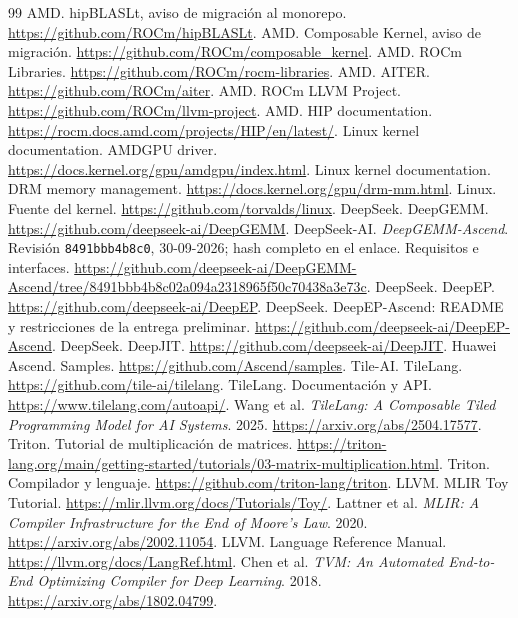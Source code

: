 \documentclass[12pt,a4paper,oneside]{report}
\begin{document}
\begin{thebibliography}{99}
 AMD. hipBLASLt, aviso de migración al monorepo. \url{https://github.com/ROCm/hipBLASLt}.
 AMD. Composable Kernel, aviso de migración. \url{https://github.com/ROCm/composable_kernel}.
 AMD. ROCm Libraries. \url{https://github.com/ROCm/rocm-libraries}.
 AMD. AITER. \url{https://github.com/ROCm/aiter}.
 AMD. ROCm LLVM Project. \url{https://github.com/ROCm/llvm-project}.
 AMD. HIP documentation. \url{https://rocm.docs.amd.com/projects/HIP/en/latest/}.
 Linux kernel documentation. AMDGPU driver. \url{https://docs.kernel.org/gpu/amdgpu/index.html}.
 Linux kernel documentation. DRM memory management. \url{https://docs.kernel.org/gpu/drm-mm.html}.
 Linux. Fuente del kernel. \url{https://github.com/torvalds/linux}.
 DeepSeek. DeepGEMM. \url{https://github.com/deepseek-ai/DeepGEMM}.
 DeepSeek-AI. \emph{DeepGEMM-Ascend}. Revisión \texttt{8491bbb4b8c0}, 30-09-2026; hash completo en el enlace. Requisitos e interfaces. \url{https://github.com/deepseek-ai/DeepGEMM-Ascend/tree/8491bbb4b8c02a094a2318965f50c70438a3e73c}.
 DeepSeek. DeepEP. \url{https://github.com/deepseek-ai/DeepEP}.
 DeepSeek. DeepEP-Ascend: README y restricciones de la entrega preliminar. \url{https://github.com/deepseek-ai/DeepEP-Ascend}.
 DeepSeek. DeepJIT. \url{https://github.com/deepseek-ai/DeepJIT}.
 Huawei Ascend. Samples. \url{https://github.com/Ascend/samples}.
 Tile-AI. TileLang. \url{https://github.com/tile-ai/tilelang}.
 TileLang. Documentación y API. \url{https://www.tilelang.com/autoapi/}.
 Wang et al. \emph{TileLang: A Composable Tiled Programming Model for AI Systems}. 2025. \url{https://arxiv.org/abs/2504.17577}.
 Triton. Tutorial de multiplicación de matrices. \url{https://triton-lang.org/main/getting-started/tutorials/03-matrix-multiplication.html}.
 Triton. Compilador y lenguaje. \url{https://github.com/triton-lang/triton}.
 LLVM. MLIR Toy Tutorial. \url{https://mlir.llvm.org/docs/Tutorials/Toy/}.
 Lattner et al. \emph{MLIR: A Compiler Infrastructure for the End of Moore's Law}. 2020. \url{https://arxiv.org/abs/2002.11054}.
 LLVM. Language Reference Manual. \url{https://llvm.org/docs/LangRef.html}.
 Chen et al. \emph{TVM: An Automated End-to-End Optimizing Compiler for Deep Learning}. 2018. \url{https://arxiv.org/abs/1802.04799}.

\end{thebibliography}
\end{document}
